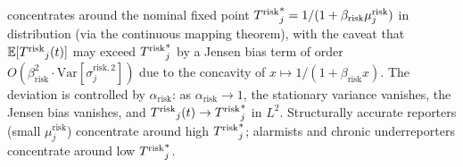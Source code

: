 \begin{proposition}
    concentrates around the nominal fixed point
    ${T^{\mathrm{risk}}}_j^* = 1 / (1 + \beta_{\mathrm{risk}} \mu_j^{\mathrm{risk}})$
    in distribution (via the continuous mapping theorem), with the
    caveat that $\mathbb{E}[{T^{\mathrm{risk}}}_j(t)]$ may exceed ${T^{\mathrm{risk}}}_j^*$ by
    a Jensen bias term of order
    $O(\beta_{\mathrm{risk}}^2 \cdot
    \mathrm{Var}[\sigma_j^{\mathrm{risk},2}])$ due to the concavity
    of $x \mapsto 1/(1 + \beta_{\mathrm{risk}} x)$. The deviation
    is controlled by $\alpha_{\mathrm{risk}}$: as
    $\alpha_{\mathrm{risk}} \to 1$, the stationary variance vanishes,
    the Jensen bias vanishes, and ${T^{\mathrm{risk}}}_j(t) \to {T^{\mathrm{risk}}}_j^*$ in
    $L^2$. Structurally accurate reporters (small
    $\mu_j^{\mathrm{risk}}$) concentrate around high ${T^{\mathrm{risk}}}_j^*$;
    alarmists and chronic underreporters concentrate around low
    ${T^{\mathrm{risk}}}_j^*$.
\end{proposition}

